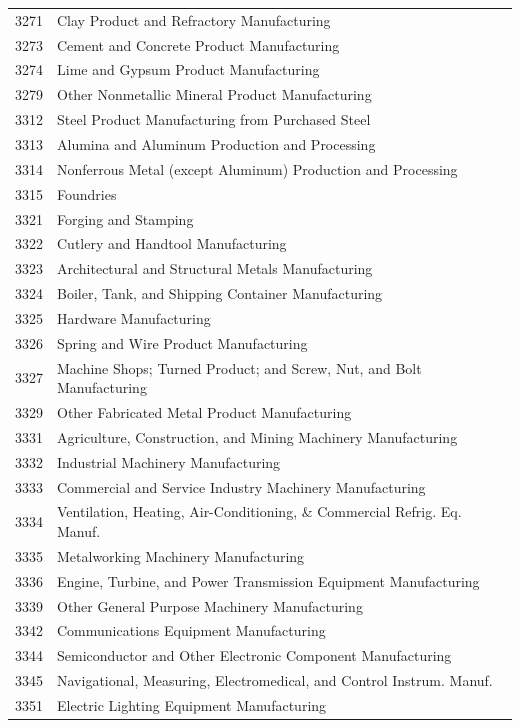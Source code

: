 \begin{longtable}{cl}
3271 &	Clay Product and Refractory Manufacturing \\
3273 &	Cement and Concrete Product Manufacturing \\
3274 &	Lime and Gypsum Product Manufacturing \\
3279 &	Other Nonmetallic Mineral Product Manufacturing \\
3312 &	Steel Product Manufacturing from Purchased Steel \\
3313 &	Alumina and Aluminum Production and Processing \\
3314 &	Nonferrous Metal (except Aluminum) Production and Processing \\
3315 &	Foundries \\
3321 &	Forging and Stamping \\
3322 &	Cutlery and Handtool Manufacturing \\
3323 &	Architectural and Structural Metals Manufacturing \\
3324 &	Boiler, Tank, and Shipping Container Manufacturing \\
3325 &	Hardware Manufacturing \\
3326 &	Spring and Wire Product Manufacturing \\
3327 &	Machine Shops; Turned Product; and Screw, Nut, and Bolt Manufacturing \\
3329 &	Other Fabricated Metal Product Manufacturing \\
3331 &	Agriculture, Construction, and Mining Machinery Manufacturing \\
3332 &	Industrial Machinery Manufacturing \\
3333 &	Commercial and Service Industry Machinery Manufacturing \\
3334 &	Ventilation, Heating, Air-Conditioning, \& Commercial Refrig. Eq. Manuf. \\
3335 &	Metalworking Machinery Manufacturing \\
3336 &	Engine, Turbine, and Power Transmission Equipment Manufacturing \\
3339 &	Other General Purpose Machinery Manufacturing \\
3342 &	Communications Equipment Manufacturing \\
3344 &	Semiconductor and Other Electronic Component Manufacturing \\
3345 &	Navigational, Measuring, Electromedical, and Control Instrum. Manuf. \\
3351 &	Electric Lighting Equipment Manufacturing \\

\end{longtable}
